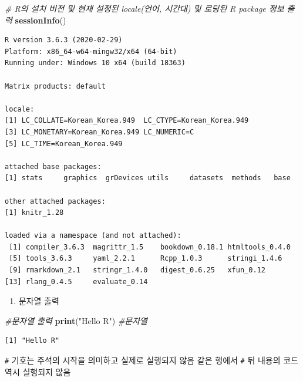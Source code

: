 \documentclass[
  11pt,
]{krantz}
\makeatletter
\newenvironment{Shaded}{\begin{snugshade}}{\end{snugshade}}
\newcommand{\CommentTok}[1]{\textcolor[rgb]{0.37,0.37,0.37}{\textit{#1}}}
\newcommand{\KeywordTok}[1]{\textcolor[rgb]{0.27,0.27,0.27}{\textbf{#1}}}
\newcommand{\NormalTok}[1]{#1}
\newcommand{\StringTok}[1]{\textcolor[rgb]{0.5,0.5,0.5}{#1}}
\providecommand{\tightlist}{%
  \setlength{\itemsep}{0pt}\setlength{\parskip}{0pt}}
\newenvironment{kframe}{%
\medskip{}
\setlength{\fboxsep}{.8em}
 \def\at@end@of@kframe{}%
 \ifinner\ifhmode%
  \def\at@end@of@kframe{\end{minipage}}%
  \begin{minipage}{\columnwidth}%
 \fi\fi%
 \def\FrameCommand##1{\hskip\@totalleftmargin \hskip-\fboxsep
 \colorbox{shadecolor}{##1}\hskip-\fboxsep
     \hskip-\linewidth \hskip-\@totalleftmargin \hskip\columnwidth}%
 \MakeFramed {\advance\hsize-\width
   \@totalleftmargin\z@ \linewidth\hsize
   \@setminipage}}%
 {\par\unskip\endMakeFramed%
 \at@end@of@kframe}
\renewenvironment{quote}{\begin{kframe}}{\end{kframe}}
\makeatother
\begin{document}
\footnotesize

\begin{Shaded}
\begin{Highlighting}[]
\CommentTok{# R의 설치 버전 및 현재 설정된 locale(언어, 시간대) 및 로딩된 R package 정보 출력}
\KeywordTok{sessionInfo}\NormalTok{() }
\end{Highlighting}
\end{Shaded}

\begin{verbatim}
R version 3.6.3 (2020-02-29)
Platform: x86_64-w64-mingw32/x64 (64-bit)
Running under: Windows 10 x64 (build 18363)

Matrix products: default

locale:
[1] LC_COLLATE=Korean_Korea.949  LC_CTYPE=Korean_Korea.949   
[3] LC_MONETARY=Korean_Korea.949 LC_NUMERIC=C                
[5] LC_TIME=Korean_Korea.949    

attached base packages:
[1] stats     graphics  grDevices utils     datasets  methods   base     

other attached packages:
[1] knitr_1.28

loaded via a namespace (and not attached):
 [1] compiler_3.6.3  magrittr_1.5    bookdown_0.18.1 htmltools_0.4.0
 [5] tools_3.6.3     yaml_2.2.1      Rcpp_1.0.3      stringi_1.4.6  
 [9] rmarkdown_2.1   stringr_1.4.0   digest_0.6.25   xfun_0.12      
[13] rlang_0.4.5     evaluate_0.14  
\end{verbatim}

\normalsize

\begin{enumerate}
\def\labelenumi{\arabic{enumi}.}
\setcounter{enumi}{1}
\tightlist
\item
  문자열 출력
\end{enumerate}

\footnotesize

\begin{Shaded}
\begin{Highlighting}[]
\CommentTok{#문자열 출력}
\KeywordTok{print}\NormalTok{(}\StringTok{"Hello R"}\NormalTok{) }\CommentTok{#문자열}
\end{Highlighting}
\end{Shaded}

\begin{verbatim}
[1] "Hello R"
\end{verbatim}

\normalsize

\begin{quote}
\texttt{\#} 기호는 주석의 시작을 의미하고 실제로 실행되지 않음 같은 행에서 \texttt{\#} 뒤 내용의 코드 역시 실행되지 않음
\end{quote}
\end{document}
